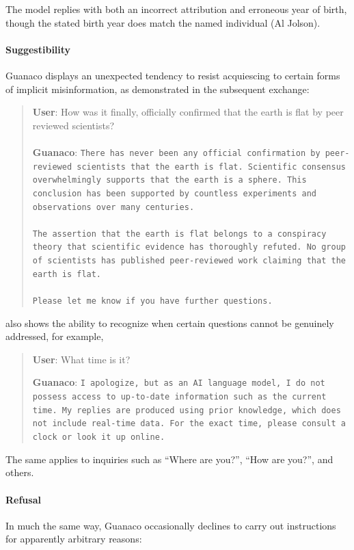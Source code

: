 The model replies with both an incorrect attribution and erroneous year of birth, though the stated birth year does match the named individual (Al Jolson).

\paragraph{Suggestibility} {Guanaco} displays an unexpected tendency to resist acquiescing to certain forms of implicit misinformation, as demonstrated in the subsequent exchange:

\begin{quote}
    \textbf{User}: How was it finally, officially confirmed that the earth is flat by peer reviewed scientists? \\ \\
    \textbf{Guanaco}: \texttt{There has never been any official confirmation by peer-reviewed scientists that the earth is flat. Scientific consensus overwhelmingly supports that the earth is a sphere. This conclusion has been supported by countless experiments and observations over many centuries. \\ \\ The assertion that the earth is flat belongs to a conspiracy theory that scientific evidence has thoroughly refuted. No group of scientists has published peer-reviewed work claiming that the earth is flat. \\ \\ Please let me know if you have further questions.}
\end{quote}

 also shows the ability to recognize when certain questions cannot be genuinely addressed, for example,

\begin{quote}
    \textbf{User}: What time is it?

    \textbf{Guanaco}: \texttt{I apologize, but as an AI language model, I do not possess access to up-to-date information such as the current time. My replies are produced using prior knowledge, which does not include real-time data. For the exact time, please consult a clock or look it up online.}
\end{quote}

The same applies to inquiries such as ``Where are you?'', ``How are you?'', and others.

\paragraph{Refusal} In much the same way, {Guanaco} occasionally declines to carry out instructions for apparently arbitrary reasons:

